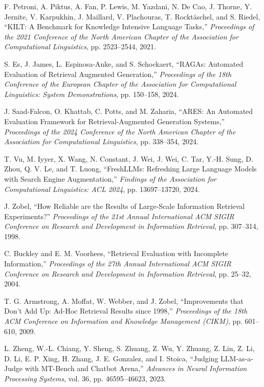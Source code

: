 F. Petroni, A. Piktus, A. Fan, P. Lewis, M. Yazdani, N. De Cao, J. Thorne,
Y. Jernite, V. Karpukhin, J. Maillard, V. Plachouras, T. Rockt\"aschel, and
S. Riedel,
``KILT: A Benchmark for Knowledge Intensive Language Tasks,''
\textit{Proceedings of the 2021 Conference of the North American Chapter of the
Association for Computational Linguistics},
pp. 2523--2544, 2021.

S. Es, J. James, L. Espinosa-Anke, and S. Schockaert,
``RAGAs: Automated Evaluation of Retrieval Augmented Generation,''
\textit{Proceedings of the 18th Conference of the European Chapter of the
Association for Computational Linguistics: System Demonstrations},
pp. 150--158, 2024.

J. Saad-Falcon, O. Khattab, C. Potts, and M. Zaharia,
``ARES: An Automated Evaluation Framework for Retrieval-Augmented Generation
Systems,''
\textit{Proceedings of the 2024 Conference of the North American Chapter of the
Association for Computational Linguistics},
pp. 338--354, 2024.

T. Vu, M. Iyyer, X. Wang, N. Constant, J. Wei, J. Wei, C. Tar, Y.-H. Sung,
D. Zhou, Q. V. Le, and T. Luong,
``FreshLLMs: Refreshing Large Language Models with Search Engine Augmentation,''
\textit{Findings of the Association for Computational Linguistics: ACL 2024},
pp. 13697--13720, 2024.

J. Zobel,
``How Reliable are the Results of Large-Scale Information Retrieval
Experiments?''
\textit{Proceedings of the 21st Annual International ACM SIGIR Conference on
Research and Development in Information Retrieval},
pp. 307--314, 1998.

C. Buckley and E. M. Voorhees,
``Retrieval Evaluation with Incomplete Information,''
\textit{Proceedings of the 27th Annual International ACM SIGIR Conference on
Research and Development in Information Retrieval},
pp. 25--32, 2004.

T. G. Armstrong, A. Moffat, W. Webber, and J. Zobel,
``Improvements that Don't Add Up: Ad-Hoc Retrieval Results since 1998,''
\textit{Proceedings of the 18th ACM Conference on Information and Knowledge
Management (CIKM)},
pp. 601--610, 2009.

L. Zheng, W.-L. Chiang, Y. Sheng, S. Zhuang, Z. Wu, Y. Zhuang, Z. Lin, Z. Li,
D. Li, E. P. Xing, H. Zhang, J. E. Gonzalez, and I. Stoica,
``Judging LLM-as-a-Judge with MT-Bench and Chatbot Arena,''
\textit{Advances in Neural Information Processing Systems},
vol. 36, pp. 46595--46623, 2023.

